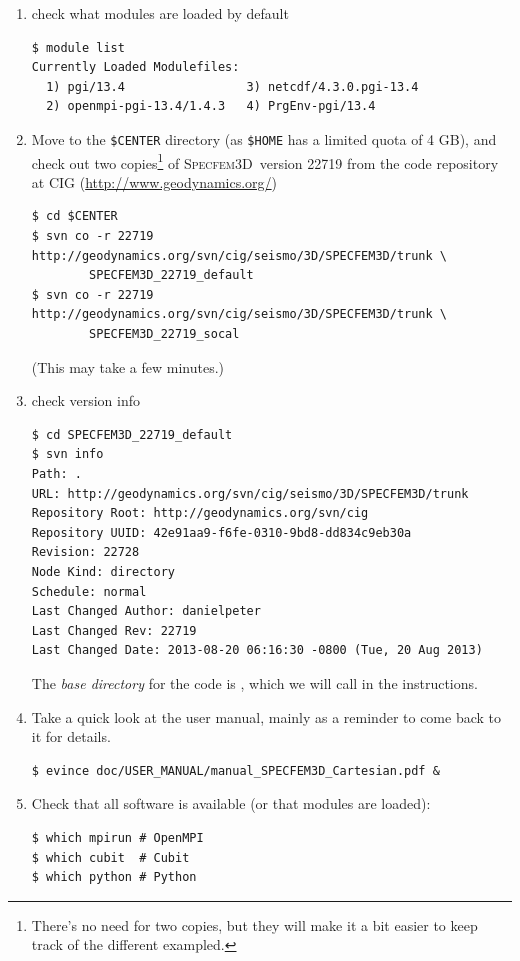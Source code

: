\documentclass[10pt,fleqn,letterpaper]{article}
\newcommand{\specfem}{\textsc{Specfem3D}}
\begin{document}
\begin{enumerate}
\item check what modules are loaded by default
\begin{lstlisting}
$ module list
Currently Loaded Modulefiles:
  1) pgi/13.4                 3) netcdf/4.3.0.pgi-13.4
  2) openmpi-pgi-13.4/1.4.3   4) PrgEnv-pgi/13.4
\end{lstlisting}

\item Move to the \verb+$CENTER+ directory (as \verb+$HOME+ has a limited quota of 4 GB), and check out two copies\footnote{There's no need for two copies, but they will make it a bit easier to keep track of the different exampled.} of \specfem\ version 22719 from the code repository at CIG (\url{http://www.geodynamics.org/})
%
\begin{lstlisting}
$ cd $CENTER
$ svn co -r 22719 http://geodynamics.org/svn/cig/seismo/3D/SPECFEM3D/trunk \
        SPECFEM3D_22719_default
$ svn co -r 22719 http://geodynamics.org/svn/cig/seismo/3D/SPECFEM3D/trunk \
        SPECFEM3D_22719_socal
\end{lstlisting}
%
(This may take a few minutes.)

\item check version info
%
\begin{lstlisting}
$ cd SPECFEM3D_22719_default
$ svn info
Path: .
URL: http://geodynamics.org/svn/cig/seismo/3D/SPECFEM3D/trunk
Repository Root: http://geodynamics.org/svn/cig
Repository UUID: 42e91aa9-f6fe-0310-9bd8-dd834c9eb30a
Revision: 22728
Node Kind: directory
Schedule: normal
Last Changed Author: danielpeter
Last Changed Rev: 22719
Last Changed Date: 2013-08-20 06:16:30 -0800 (Tue, 20 Aug 2013)
\end{lstlisting}

The {\em base directory} for the code is , which we will call  in the instructions.

\item Take a quick look at the user manual, mainly as a reminder to come back to it for details. 
%
\begin{lstlisting}
$ evince doc/USER_MANUAL/manual_SPECFEM3D_Cartesian.pdf &
\end{lstlisting}

\item Check that all software is available (or that modules are loaded):
\begin{lstlisting}
$ which mpirun # OpenMPI
$ which cubit  # Cubit
$ which python # Python
\end{lstlisting}


\end{enumerate}
\end{document}
